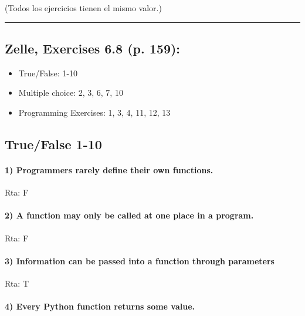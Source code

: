 \documentclass[11pt]{article}
\providecommand{\tightlist}{%
      \setlength{\itemsep}{0pt}\setlength{\parskip}{0pt}}
\begin{document}
(Todos los ejercicios tienen el mismo valor.)

    \begin{center}\rule{0.5\linewidth}{\linethickness}\end{center}

    \subsection{Zelle, Exercises 6.8 (p.
159):}\label{zelle-exercises-6.8-p.-159}

\begin{itemize}
\tightlist
\item
  True/False: 1-10
\item
  Multiple choice: 2, 3, 6, 7, 10
\item
  Programming Exercises: 1, 3, 4, 11, 12, 13
\end{itemize}

    \subsection{True/False 1-10}\label{truefalse-1-10}

    \paragraph{1) Programmers rarely define their own
functions.}\label{programmers-rarely-define-their-own-functions.}

Rta: F

    \paragraph{2) A function may only be called at one place in a
program.}\label{a-function-may-only-be-called-at-one-place-in-a-program.}

Rta: F

    \paragraph{3) Information can be passed into a function through
parameters}\label{information-can-be-passed-into-a-function-through-parameters}

Rta: T

    \paragraph{4) Every Python function returns some
value.}\label{every-python-function-returns-some-value.}
\end{document}
